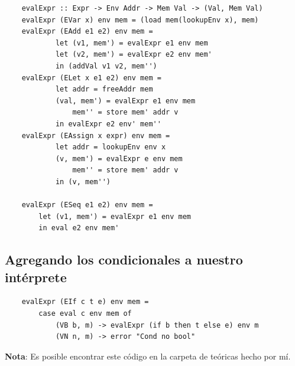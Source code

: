\documentclass[10pt,a4paper]{article}
\begin{document}
\begin{lstlisting}
    evalExpr :: Expr -> Env Addr -> Mem Val -> (Val, Mem Val)
    evalExpr (EVar x) env mem = (load mem(lookupEnv x), mem)
    evalExpr (EAdd e1 e2) env mem =
            let (v1, mem') = evalExpr e1 env mem 
            let (v2, mem') = evalExpr e2 env mem'
            in (addVal v1 v2, mem'')
    evalExpr (ELet x e1 e2) env mem = 
            let addr = freeAddr mem 
            (val, mem') = evalExpr e1 env mem 
                mem'' = store mem' addr v 
            in evalExpr e2 env' mem''
    evalExpr (EAssign x expr) env mem = 
            let addr = lookupEnv env x 
            (v, mem') = evalExpr e env mem 
                mem'' = store mem' addr v 
            in (v, mem'')
        
    evalExpr (ESeq e1 e2) env mem = 
        let (v1, mem') = evalExpr e1 env mem 
        in eval e2 env mem'
\end{lstlisting}
\subsection*{Agregando los condicionales a nuestro intérprete}
\begin{lstlisting}
    evalExpr (EIf c t e) env mem = 
        case eval c env mem of 
            (VB b, m) -> evalExpr (if b then t else e) env m
            (VN n, m) -> error "Cond no bool"
\end{lstlisting}
\textbf{Nota}: Es posible encontrar este código en la carpeta de teóricas hecho por mí.
\end{document}
